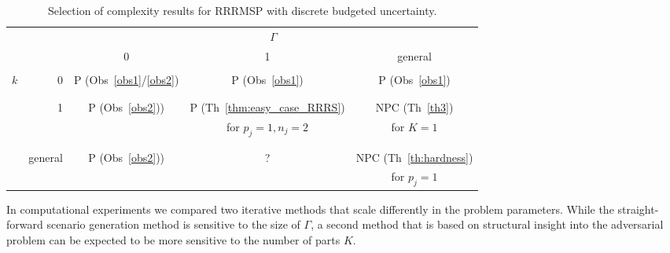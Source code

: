 \begin{table}[htb]
\begin{center}
\begin{tabular}{rr|c|c|c}
 & & \multicolumn{3}{c}{$\Gamma$} \\
 & & 0 & 1 & general \\
 \hline
 & & & & \\[-1.5ex]
\multirow{8}{*}{$k$} & \multirow{2}{*}{0} & \multirow{2}{*}{P (Obs~\ref{obs1}/\ref{obs2})} & \multirow{2}{*}{P (Obs~\ref{obs1})} & \multirow{2}{*}{P (Obs~\ref{obs1})}\\
& & & & \\[-1.5ex]
 & & & & \phantom{for $p_j=1,n_j=2$} \\
\cline{3-5} & & & & \\[-1.5ex]
 & \multirow{2}{*}{1} & \multirow{2}{*}{P (Obs~\ref{obs2}))} & P  (Th~\ref{thm:easy_case_RRRS}) & NPC (Th~\ref{th3}) \\
 &   &   \phantom{for $p_j=1,n_j=2$}     & for $p_j=1,n_j=2$ & for $K=1$  \\
 & & & & \\[-1.5ex]
\cline{3-5} & & & & \\[-1.5ex]
 & \multirow{2}{*}{general} & \multirow{2}{*}{P (Obs~\ref{obs2}))} & \multirow{2}{*}{?} & NPC  (Th~\ref{th:hardness}) \\
 &         &         &   & for $p_j=1$
\end{tabular}
\end{center}
\caption{Selection of complexity results for RRRMSP with discrete budgeted uncertainty.\label{tab:summary}}
\end{table}


In computational experiments we compared two iterative methods that scale differently in the problem parameters. While the straight-forward scenario generation method is sensitive to the size of $\Gamma$, a second method that is based on structural insight into the adversarial problem can be expected to be more sensitive to the number of parts $K$.

